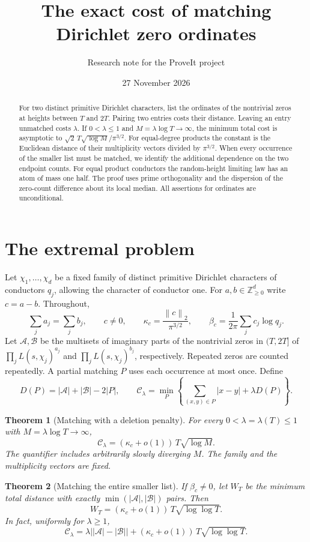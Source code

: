 \documentclass[11pt]{article}
\title{The exact cost of matching Dirichlet zero ordinates}
\author{Research note for the ProveIt project}
\date{27 November 2026}
\newtheorem{theorem}{Theorem}
\newcommand{\cost}{\mathcal C}
\newcommand{\A}{\mathcal A}
\newcommand{\B}{\mathcal B}
\newcommand{\norm}[1]{\left\lVert #1\right\rVert}
\begin{document}
\maketitle
\begin{abstract}
For two distinct primitive Dirichlet characters, list the ordinates of the nontrivial zeros at heights between $T$ and $2T$. Pairing two entries costs their distance. Leaving an entry unmatched costs $\lambda$.
If $0<\lambda\le1$ and $M=\lambda\log T\longrightarrow\infty$, the minimum total cost is asymptotic to
$\sqrt{2}\,T\sqrt{\log M}/\pi^{3/2}$. For equal-degree products the constant is the Euclidean distance of their multiplicity vectors divided by $\pi^{3/2}$. When every occurrence of the smaller list must be matched, we identify the additional dependence on the two endpoint counts. For equal product conductors the random-height limiting law has an atom of mass one half. The proof uses prime orthogonality and the dispersion of the zero-count difference about its local median. All assertions for ordinates are unconditional.
\end{abstract}

\section{The extremal problem}
Let $\chi_1,\ldots,\chi_d$ be a fixed family of distinct primitive Dirichlet characters of conductors $q_j$, allowing the character of conductor one. For $a,b\in\mathbb Z_{\ge0}^d$ write $c=a-b$. Throughout,
\[
 \sum_j a_j=\sum_j b_j,\qquad c\ne0,\qquad
 \kappa_c=\frac{\norm{c}_2}{\pi^{3/2}},\qquad
 \beta_c=\frac{1}{2\pi}\sum_j c_j\log q_j.
\]
Let $\A,\B$ be the multisets of imaginary parts of the nontrivial zeros in $(T,2T]$ of $\prod_jL(s,\chi_j)^{a_j}$ and $\prod_jL(s,\chi_j)^{b_j}$, respectively. Repeated zeros are counted repeatedly. A partial matching $P$ uses each occurrence at most once. Define
\[
 D(P)=|\A|+|\B|-2|P|,\qquad
 \cost_\lambda=\min_P\left\{\sum_{(x,y)\in P}|x-y|+\lambda D(P)\right\}.
\]

\begin{theorem}[Matching with a deletion penalty]\label{th:main}
For every $0<\lambda=\lambda(T)\le1$ with $M=\lambda\log T\to\infty$,
\[
 \cost_\lambda=(\kappa_c+o(1))\,T\sqrt{\log M}.
\]
The quantifier includes arbitrarily slowly diverging $M$. The family and the multiplicity vectors are fixed.
\end{theorem}

\begin{theorem}[Matching the entire smaller list]\label{th:full}
If $\beta_c\ne0$, let $W_T$ be the minimum total distance with exactly $\min(|\A|,|\B|)$ pairs. Then
\[
 W_T=(\kappa_c+o(1))\,T\sqrt{\log\log T}.
\]
In fact, uniformly for $\lambda\ge1$,
\[
 \cost_\lambda=\lambda\bigl||\A|-|\B|\bigr|
       +(\kappa_c+o(1))\,T\sqrt{\log\log T}.
\]
\end{theorem}
\end{document}
